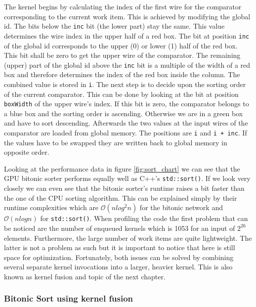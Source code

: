 The kernel begins by calculating the index of the first wire for the comparator corresponding to the current work item. This is achieved by modifying the global id. The bits below the \lstinline!inc! bit (the lower part) stay the same. This value determines the wire index in the upper half of a red box. The bit at position \lstinline!inc! of the global id corresponds to the upper (0) or lower (1) half of the red box. This bit shall be zero to get the upper wire of the comparator. The remaining (upper) part of the global id above the \lstinline!inc! bit is a multiple of the width of a red box and therefore determines the index of the red box inside the column. The combined value is stored in \lstinline!i!.
The next step is to decide upon the sorting order of the current comparator. This can be done by looking at the bit at position \lstinline!boxWidth! of the upper wire's index. If this bit is zero, the comparator belongs to a blue box and the sorting order is ascending. Otherwise we are in a green box and have to sort descending.
Afterwards the two values at the input wires of the comparator are loaded from global memory. The positions are \lstinline!i! and \lstinline!i + inc!. If the values have to be swapped they are written back to global memory in opposite order.

Looking at the performance data in figure \ref{fig:sort_chart} we can see that the GPU bitonic sorter performs equally well as C++'s \lstinline!std::sort()!. If we look very closely we can even see that the bitonic sorter's runtime raises a bit faster than the one of the CPU sorting algorithm. This can be explained simply by their runtime complexities which are $\mathcal{O}(n log^2 n)$ for the bitonic network and $\mathcal{O}(n log n)$ for \lstinline!std::sort()!.
When profiling the code the first problem that can be noticed are the number of enqueued kernels which is 1053 for an input of $2^{26}$ elements. Furthermore, the large number of work items are quite lightweight. The latter is not a problem as such but it is important to notice that here is still space for optimization. Fortunately, both issues can be solved by combining several separate kernel invocations into a larger, heavier kernel. This is also known as kernel fusion and topic of the next chapter.


\subsubsection{Bitonic Sort using kernel fusion}

